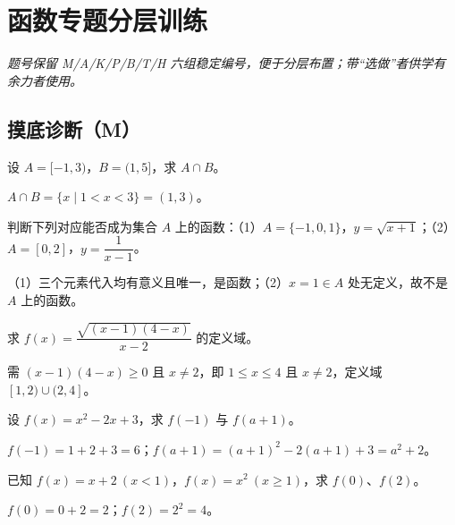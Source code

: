 \chapter{函数专题分层训练}

\begin{center}
{\small\itshape 题号保留 M/A/K/P/B/T/H 六组稳定编号，便于分层布置；带“选做”者供学有余力者使用。}
\end{center}

\section{摸底诊断（M）}

\begin{problem}
设 $A=[-1,3)$，$B=(1,5]$，求 $A\cap B$。
\end{problem}
\begin{solution}
$A\cap B=\{x\mid 1<x<3\}=(1,3)$。
\end{solution}

\begin{problem}
判断下列对应能否成为集合 $A$ 上的函数：（1）$A=\{-1,0,1\}$，$y=\sqrt{x+1}$；（2）$A=[0,2]$，$y=\dfrac{1}{x-1}$。
\end{problem}
\begin{solution}
（1）三个元素代入均有意义且唯一，是函数；（2）$x=1\in A$ 处无定义，故不是 $A$ 上的函数。
\end{solution}

\begin{problem}
求 $f(x)=\dfrac{\sqrt{(x-1)(4-x)}}{x-2}$ 的定义域。
\end{problem}
\begin{solution}
需 $(x-1)(4-x)\ge0$ 且 $x\ne2$，即 $1\le x\le4$ 且 $x\ne2$，定义域 $[1,2)\cup(2,4]$。
\end{solution}

\begin{problem}
设 $f(x)=x^2-2x+3$，求 $f(-1)$ 与 $f(a+1)$。
\end{problem}
\begin{solution}
$f(-1)=1+2+3=6$；$f(a+1)=(a+1)^2-2(a+1)+3=a^2+2$。
\end{solution}

\begin{problem}
已知 $f(x)=x+2\ (x<1)$，$f(x)=x^2\ (x\ge1)$，求 $f(0)$、$f(2)$。
\end{problem}
\begin{solution}
$f(0)=0+2=2$；$f(2)=2^2=4$。
\end{solution}

